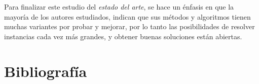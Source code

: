 \documentclass[letter, 10pt]{article}
\begin{document}
Para finalizar este estudio del \textit{estado del arte}, se hace un énfasis en que la mayoría de los autores estudiados, indican que sus métodos y algoritmos tienen muchas variantes por probar y mejorar, por lo tanto las posibilidades de resolver instancias cada vez más grandes, y obtener buenas soluciones están abiertas.


 
\newpage
\section{Bibliografía}



\end{document}
